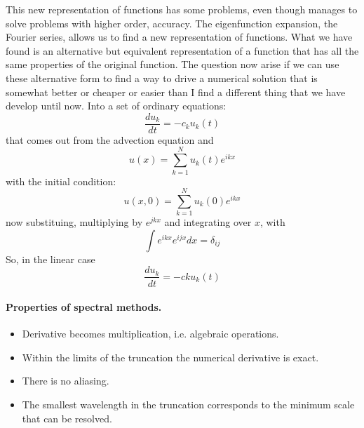 This new representation of functions has some problems, even though manages to solve problems with higher order, accuracy. The eigenfunction expansion, the Fourier series, allows us to find a new representation of functions. What we have found is an alternative but equivalent representation of a function that has all the same properties of the original function. The question now arise if we can use these alternative form to find a way to drive a numerical solution that is somewhat better or cheaper or easier than I find a different thing that we have develop until now. Into a set of ordinary equations:
$$ \frac{du_k}{dt}=-c_ku_k(t) $$
that comes out from the advection equation and
\begin{equation}\label{eq.u(x)}
	u(x)=\displaystyle\sum_{k=1}^Nu_k(t)e^{ikx}
\end{equation} with the initial condition:
\begin{equation}\label{eq.u(x,0)}
	u(x,0)=\displaystyle\sum_{k=1}^Nu_k(0)e^{ikx}
\end{equation}
now substituing, multiplying by $e^{jkx}$ and integrating  over $x$, with $$\int e^{ikx}e^{ijx}dx=\delta_{ij}$$
So, in the linear case
\begin{equation}
	\frac{du_k}{dt}=-cku_k(t)
\end{equation}
\paragraph{Properties of spectral methods.}
\begin{itemize}
	\item Derivative becomes multiplication, i.e. algebraic operations.
	\item Within the limits of the truncation the numerical derivative is exact.
	\item There is no aliasing.
	\item The smallest wavelength in the truncation corresponds to the minimum scale that can be resolved.
\end{itemize}
